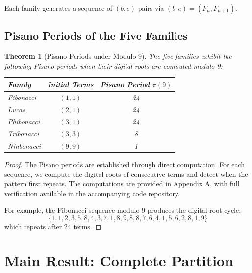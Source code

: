 \documentclass[12pt]{article}
\newtheorem{theorem}{Theorem}
\begin{document}
Each family generates a sequence of $(b, e)$ pairs via $(b, e) = (F_n, F_{n+1})$.

\subsection{Pisano Periods of the Five Families}

\begin{theorem}[Pisano Periods under Modulo 9]\label{thm:pisano}
The five families exhibit the following Pisano periods when their digital roots are computed modulo 9:

\begin{center}
\begin{tabular}{lcc}
\toprule
\textbf{Family} & \textbf{Initial Terms} & \textbf{Pisano Period $\pi(9)$} \\
\midrule
Fibonacci & $(1, 1)$ & 24 \\
Lucas & $(2, 1)$ & 24 \\
Phibonacci & $(3, 1)$ & 24 \\
Tribonacci & $(3, 3)$ & 8 \\
Ninbonacci & $(9, 9)$ & 1 \\
\bottomrule
\end{tabular}
\end{center}
\end{theorem}

\begin{proof}
The Pisano periods are established through direct computation. For each sequence, we compute the digital roots of consecutive terms and detect when the pattern first repeats. The computations are provided in Appendix A, with full verification available in the accompanying code repository.

For example, the Fibonacci sequence modulo 9 produces the digital root cycle:
\[
\{1, 1, 2, 3, 5, 8, 4, 3, 7, 1, 8, 9, 8, 8, 7, 6, 4, 1, 5, 6, 2, 8, 1, 9\}
\]
which repeats after 24 terms.
\end{proof}

\section{Main Result: Complete Partition}
\end{document}

